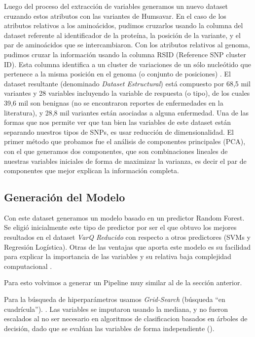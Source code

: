Luego del proceso del extracción de variables generamos un nuevo dataset cruzando estos atributos con las variantes de Humsavar. En el caso de los atributos relativos a los aminoácidos, pudimos cruzarlos usando la columna del dataset referente al identificador de la proteína, la posición de la variante, y el par de aminoácidos que se intercambiaron. Con los atributos relativos al genoma, pudimos cruzar la información usando la columna RSID (Reference SNP cluster ID). Esta columna identifica a un cluster de variaciones de un sólo nucleótido que pertenece a la misma posición en el genoma (o conjunto de posiciones) \cite{Ostell2007}. 
El dataset resultante (denominado \textit{Dataset Estructural}) está compuesto por 68,5 mil variantes y 28 variables incluyendo la variable de respuesta (o tipo), de los cuales 39,6 mil son benignas (no se encontraron reportes de enfermedades en la literatura), y 28,8 mil variantes están asociadas a alguna enfermedad. 
Una de las formas que nos permite ver que tan bien las variables de este dataset están separando nuestros tipos de SNPs, es usar reducción de dimensionalidad. El primer método que probamos fue el análisis de componentes principales (PCA), con el que generamos dos componentes, que son combinaciones lineales de nuestras variables iniciales de forma de maximizar la varianza, es decir el par de componentes que mejor explican la información completa.


\subsection{Generación del Modelo}

Con este dataset generamos un modelo basado en un predictor Random Forest. 
Se eligió inicialmente este tipo de predictor por ser el que obtuvo los mejores resultados en el dataset \textit{VarQ Reducido}  con respecto a otros predictores (SVMs y Regresión Logística). Otras de las ventajas que aporta este modelo
es su facilidad para explicar la importancia de las variables y su relativa baja complejidad computacional \todo{[Citar?]}. 

Para esto volvimos a generar un Pipeline muy similar al de la sección anterior.

Para la búsqueda de hiperparámetros usamos \textit{Grid-Search} (búsqueda ``en cuadrícula''). . Las variables se imputaron usando la mediana, y no fueron escalados al no ser necesario en algoritmos de clasificacion basados en árboles de decisión, dado que se evalúan las variables de forma independiente (). 

